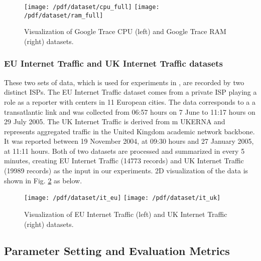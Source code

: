 \documentclass[../main.tex]{subfiles}
\begin{document}
\begin{figure}[!ht] 
   \centering
   \texttt{[image: /pdf/dataset/cpu\_full]}
   \texttt{[image: /pdf/dataset/ram\_full]}
  \caption{Visualization of Google Trace CPU (left) and Google Trace RAM (right) datasets.} 
  \label{fig_data_ggtrace} 
\end{figure}
 
\subsubsection{EU Internet Traffic and UK Internet Traffic datasets}
	
	These two sets of data, which is used for experiments in \cite{cortez2012multi}, are recorded by two distinct ISPs. The EU Internet Traffic dataset comes from a private ISP playing a role as a reporter with centers  in 11 European cities. The data corresponds to a a transatlantic link and was collected from 06:57 hours on 7 June to 11:17 hours on 29 July 2005. The UK Internet Traffic is derived from m UKERNA and represents aggregated traffic in the United Kingdom academic network backbone. It was
reported between 19 November 2004, at 09:30
hours and 27 January 2005, at 11:11 hours. Both of two datasets are processed and summarized in every 5 minutes, creating EU Internet Traffic (14773 records) and UK Internet Traffic (19989 records) as the input in our experiments. 2D visualization of the data is shown in Fig. \ref{fig_data_it} as below.

\begin{figure}[!ht] 
   \centering
   \texttt{[image: /pdf/dataset/it\_eu]}
   \texttt{[image: /pdf/dataset/it\_uk]}
  \caption{Visualization of EU Internet Traffic (left) and UK Internet Traffic (right) datasets.} 
  \label{fig_data_it} 
\end{figure}

  

\subsection{Parameter Setting and Evaluation Metrics}
	
\end{document}
